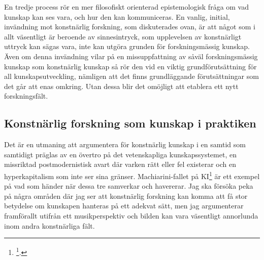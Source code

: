 \documentclass[11pt]{article}
\begin{document}
En tredje process rör en mer filosofiskt orienterad epistemologisk fråga
om vad kunskap kan ses vara, och hur den kan kommuniceras. En vanlig,
initial, invändning mot konstnärlig forskning, som diskuterades ovan, är
att något som i allt väsentligt är beroende av sinnesintryck, som
upplevelsen av konstnärligt uttryck kan sägas vara, inte kan utgöra
grunden för forskningsmässig kunskap. Även om denna invändning vilar på
en missuppfattning av såväl forskningsmässig kunskap som konstnärlig
kunskap så rör den vid en viktig grundförutsättning för all
kunskapsutveckling, nämligen att det finns grundläggande förutsättningar
som det går att enas omkring. Utan dessa blir det omöjligt att etablera
ett nytt forskningsfält.

\subsection{Konstnärlig forskning som kunskap i praktiken}
\label{sec:orgbe16191}
Det är en utmaning att argumentera för konstnärlig kunskap i en samtid
som samtidigt präglas av en övertro på det vetenskapliga
kunskapssystemet, en missriktad postmodernistisk avart där varken rätt
eller fel existerar och en hyperkapitalism som inte ser sina gränser.
Machiarini-fallet på KI\footnote{\footcite{macchiarini2019}.} är ett exempel på vad som händer när
dessa tre samverkar och havererar. Jag ska försöka peka på några områden
där jag ser att konstnärlig forskning kan komma att få stor betydelse om
kunskapen hanteras på ett adekvat sätt, men jag argumenterar framförallt
utifrån ett musikperspektiv och bilden kan vara väsentligt annorlunda
inom andra konstnärliga fält.
\end{document}
